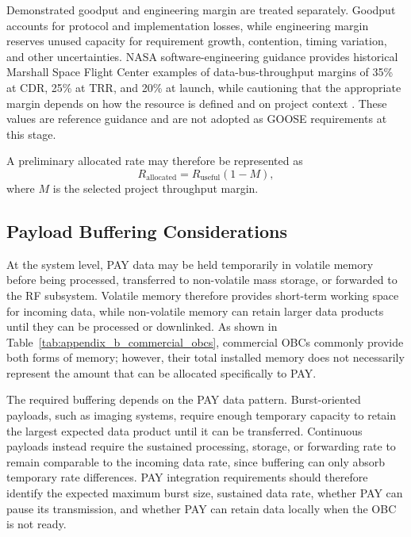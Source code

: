 \documentclass[10pt]{../datasheet}
\let\cite\citep
\begin{document}
Demonstrated goodput and engineering margin are treated separately. Goodput
accounts for protocol and implementation losses, while engineering margin
reserves unused capacity for requirement growth, contention, timing variation,
and other uncertainties. NASA software-engineering guidance provides historical
Marshall Space Flight Center examples of data-bus-throughput margins of 35\% at
CDR, 25\% at TRR, and 20\% at launch, while cautioning that the appropriate
margin depends on how the resource is defined and on project context
\cite{nasa_resource_margins}. These values are reference guidance and are not
adopted as GOOSE requirements at this stage.

A preliminary allocated rate may therefore be represented as
\begin{equation}
  R_{\mathrm{allocated}}
  =
  R_{\mathrm{useful}}(1-M),
\end{equation}
where $M$ is the selected project throughput margin.

\subsection*{Payload Buffering Considerations}

At the system level, PAY data may be held temporarily in volatile memory before
being processed, transferred to non-volatile mass storage, or forwarded to the
RF subsystem. Volatile memory therefore provides short-term working space for
incoming data, while non-volatile memory can retain larger data products until
they can be processed or downlinked. As shown in
Table~\ref{tab:appendix_b_commercial_obcs}, commercial OBCs commonly provide
both forms of memory; however, their total installed memory does not necessarily
represent the amount that can be allocated specifically to PAY.

The required buffering depends on the PAY data pattern. Burst-oriented payloads,
such as imaging systems, require enough temporary capacity to retain the largest
expected data product until it can be transferred. Continuous payloads instead
require the sustained processing, storage, or forwarding rate to remain
comparable to the incoming data rate, since buffering can only absorb temporary
rate differences. PAY integration requirements should therefore identify the
expected maximum burst size, sustained data rate, whether PAY can pause its
transmission, and whether PAY can retain data locally when the OBC is not ready.
\end{document}
